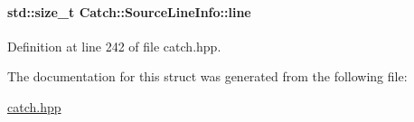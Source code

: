 \paragraph[{line}]{\setlength{\rightskip}{0pt plus 5cm}std\+::size\+\_\+t Catch\+::\+Source\+Line\+Info\+::line}\label{a00075_a841e5d696c7b9cde24e45e61dd979c77}


Definition at line 242 of file catch.\+hpp.



The documentation for this struct was generated from the following file\+:\begin{DoxyCompactItemize}
\item 
\hyperlink{a00094}{catch.\+hpp}\end{DoxyCompactItemize}
